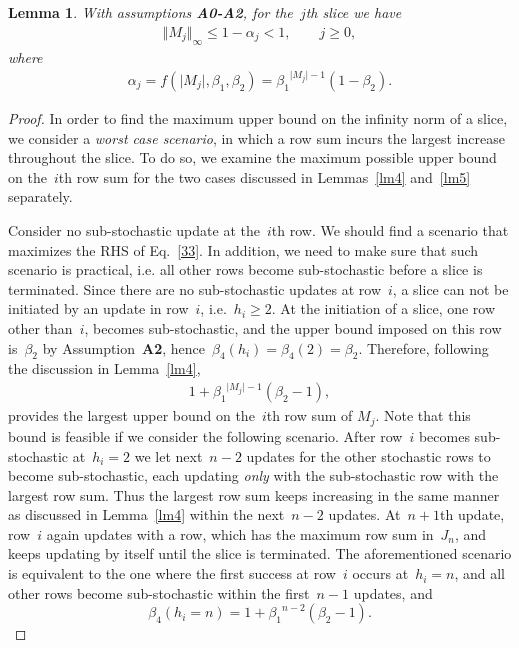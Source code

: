 \documentclass[draftclsnofoot, onecolumn, 12pt]{IEEEtran}
\newtheorem{lem}{Lemma}
\begin{document}
\begin{lem}\label{lm7}
With assumptions {\bf{A0-A2}}, for the~$j$th slice we have
\begin{eqnarray}\label{41}
{{\Vert M_j \Vert}_{\infty}} \leq 1-{\alpha}_j <1, \qquad j\geq0,
\end{eqnarray}
where 
\begin{eqnarray}\label{42}
{\alpha}_j = f({{\vert M_j \vert}},\beta_1,\beta_2)={\beta_1}^{{{\vert M_j \vert}} - 1}({1-\beta}_2).
\end{eqnarray}
\end{lem}
\begin{proof}
In order to find the maximum upper bound on the infinity norm of a slice, we  consider a \textit{worst case scenario}, in which a row sum incurs the largest increase throughout the slice. To do so, we examine the maximum possible upper bound on the~$i$th row sum for the two cases discussed in Lemmas~\ref{lm4} and~\ref{lm5} separately. 

Consider no sub-stochastic update at the~$i$th row. We should find a scenario that maximizes the RHS of Eq.~\eqref{33}. In addition, we need to make sure that such scenario is practical, i.e. all other rows become sub-stochastic before a slice is terminated. Since there are no sub-stochastic updates at row~$i$, a slice can not be initiated by an update in row~$i$, i.e.~$h_i \geq 2$. At the initiation of a slice, one row other than~$i$, becomes sub-stochastic, and the upper bound imposed on this row is~$\beta_2$ by Assumption~{\bf{A2}}, hence~${\beta}_4(h_i)={\beta}_4(2)=\beta_2$. Therefore, following the discussion in Lemma~\ref{lm4},
\begin{eqnarray}\label{43}
1+{\beta_1}^{\vert {M_j}\vert - 1}({\beta}_2-1),
\end{eqnarray}
provides the largest upper bound on the~$i$th row sum of $M_j$. Note that this bound is feasible if we consider the following scenario. After row~$i$ becomes sub-stochastic at~$h_i=2$ we let next~$n-2$ updates for the other stochastic rows to become sub-stochastic, each updating \textit{only} with the sub-stochastic row with the largest row sum. Thus the largest row sum keeps increasing in the same manner as discussed in Lemma~\ref{lm4} within the next~$n-2$ updates. At~$n+1$th update, row~$i$ again updates with a row, which has the maximum row sum in~$J_n$, and keeps updating by itself until the slice is terminated. The aforementioned scenario is equivalent to the one where the first success at row~$i$ occurs at~$h_i=n$, and all other rows become sub-stochastic within the first~$n-1$ updates, and 
\begin{equation}
\beta_4(h_i=n)= 1 + {\beta_1}^{n-2}(\beta_2-1).
\end{equation}


\end{proof}
\end{document}
